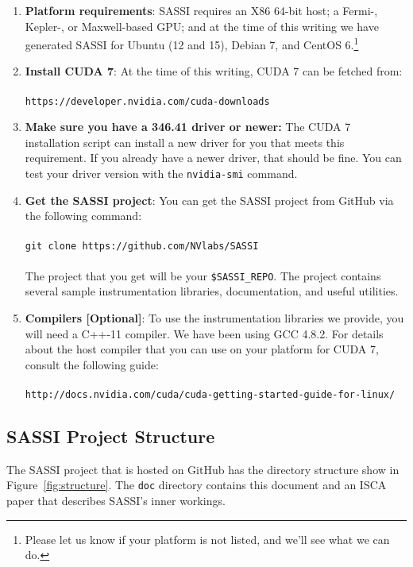 \begin{enumerate}
\item {\bf Platform requirements}: SASSI requires an X86 64-bit host;
  a Fermi-, Kepler-, or Maxwell-based GPU; and at the time of this
  writing we have generated SASSI for Ubuntu (12 and 15), Debian
  7, and CentOS 6.\footnote{Please let us know if your platform
    is not listed, and we'll see what we can do.}
\item {\bf Install CUDA 7}: At the time of this writing, CUDA 7 can
  be fetched
  from:\\ \\  \texttt{https://developer.nvidia.com/cuda-downloads} \\
\item {\bf Make sure you have a 346.41 driver or newer:} The CUDA 7
  installation script can install a new driver for you that meets this
  requirement.  If you already have a newer driver, that should be
  fine.  You can test your driver version with the \texttt{nvidia-smi}
  command.
\item {\bf Get the SASSI project}: You can get the SASSI project from
  GitHub via the following command: \\ \\ \texttt{git clone
    https://github.com/NVlabs/SASSI} \\ \\
  The project that you get will be your \texttt{\$SASSI\_REPO}.  The
  project contains several sample instrumentation libraries,
  documentation, and useful utilities.
\item {\bf Compilers [Optional]}: To use the instrumentation libraries
  we provide, you will need a C++-11 compiler.  We have been using GCC
  4.8.2.  For details about the host compiler that you can use on your
  platform for CUDA 7, consult the following
  guide:\\ \\ \texttt{http://docs.nvidia.com/cuda/cuda-getting-started-guide-for-linux/}
\end{enumerate}

\subsection{SASSI Project Structure}

The SASSI project that is hosted on GitHub has the directory structure
show in Figure~\ref{fig:structure}.  The \texttt{doc} directory
contains this document and an ISCA paper that describes SASSI's inner
workings.

